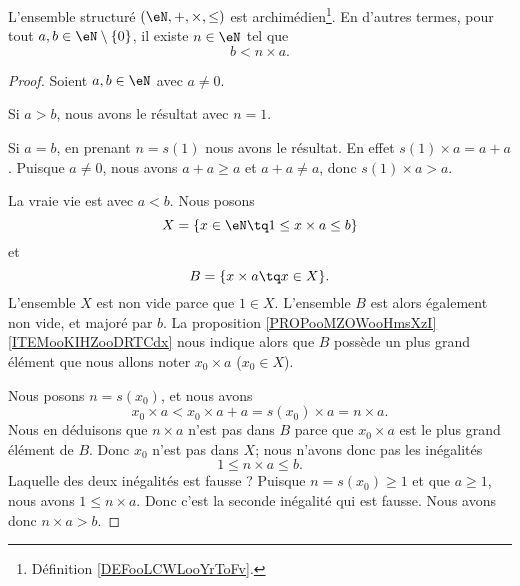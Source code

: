 \begin{proposition}     \label{PROPooCCVNooYUYcqG}
    L'ensemble structuré \( (\eN,+,\times, \leq)\) est archimédien\footnote{Définition \ref{DEFooLCWLooYrToFv}.}. En d'autres termes, pour tout \( a,b\in \eN\setminus\{ 0 \}\), il existe \( n\in \eN\) tel que
    \begin{equation}
        b<n\times a.
    \end{equation}
\end{proposition}

\begin{proof}
    Soient \( a,b\in \eN\) avec \( a\neq 0\). 

    Si \( a>b\), nous avons le résultat avec \( n=1\).

    Si \( a=b\), en prenant \( n=s(1)\) nous avons le résultat. En effet \( s(1)\times a=a+a\). Puisque \( a\neq 0\), nous avons \( a+a\geq a\) et \( a+a\neq a\), donc \( s(1)\times a>a\).

    La vraie vie est avec \( a<b\). Nous posons
    \begin{equation}
        X=\{ x\in \eN\tq 1\leq x\times a\leq b \}
    \end{equation}
    et
    \begin{equation}
        B=\{ x\times a\tq x\in X \}.
    \end{equation}
    L'ensemble \( X\) est non vide parce que \( 1\in X\). L'ensemble \( B\) est alors également non vide, et majoré par \( b\). La proposition \ref{PROPooMZOWooHmsXzI}\ref{ITEMooKIHZooDRTCdx} nous indique alors que \( B\) possède un plus grand élément que nous allons noter \( x_0\times a\) (\( x_0\in X\)).

    Nous posons \( n=s(x_0)\), et nous avons
    \begin{equation}
        x_0\times a< x_0\times a +a=s(x_0)\times a=n\times a.
    \end{equation}
    Nous en déduisons que \( n\times a\) n'est pas dans \( B\) parce que \( x_0\times a\) est le plus grand élément de \( B\). Donc \( x_0\) n'est pas dans \( X\); nous n'avons donc pas les inégalités
    \begin{equation}
        1\leq n\times a\leq b.
    \end{equation}
    Laquelle des deux inégalités est fausse ? Puisque \( n=s(x_0)\geq 1\) et que \( a\geq 1\), nous avons \( 1\leq n\times a\). Donc c'est la seconde inégalité qui est fausse. Nous avons donc \( n\times a>b\).
\end{proof}


